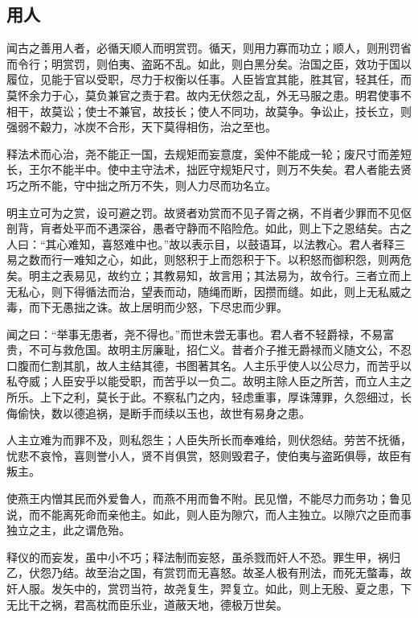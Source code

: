 \documentclass[]{article}
\begin{document}
\hypertarget{header-n1082}{%
\subsection{用人}\label{header-n1082}}

闻古之善用人者，必循天顺人而明赏罚。循天，则用力寡而功立；顺人，则刑罚省而令行；明赏罚，则伯夷、盗跖不乱。如此，则白黑分矣。治国之臣，效功于国以履位，见能于官以受职，尽力于权衡以任事。人臣皆宜其能，胜其官，轻其任，而莫怀余力于心，莫负兼官之责于君。故内无伏怨之乱，外无马服之患。明君使事不相干，故莫讼；使士不兼官，故技长；使人不同功，故莫争。争讼止，技长立，则强弱不觳力，冰炭不合形，天下莫得相伤，治之至也。

释法术而心治，尧不能正一国，去规矩而妄意度，奚仲不能成一轮；废尺寸而差短长，王尔不能半中。使中主守法术，拙匠守规矩尺寸，则万不失矣。君人者能去贤巧之所不能，守中拙之所万不失，则人力尽而功名立。

明主立可为之赏，设可避之罚。故贤者劝赏而不见子胥之祸，不肖者少罪而不见伛剖背，肓者处平而不遇深谷，愚者守静而不陷险危。如此，则上下之恩结矣。古之人曰：``其心难知，喜怒难中也。''故以表示目，以鼓语耳，以法教心。君人者释三易之数而行一难知之心，如此，则怒积于上而怨积于下。以积怒而御积怨，则两危矣。明主之表易见，故约立；其教易知，故言用；其法易为，故令行。三者立而上无私心，则下得循法而治，望表而动，随绳而断，因攒而缝。如此，则上无私威之毒，而下无愚拙之诛。故上居明而少怒，下尽忠而少罪。

闻之曰：``举事无患者，尧不得也。''而世未尝无事也。君人者不轻爵禄，不易富贵，不可与救危国。故明主厉廉耻，招仁义。昔者介子推无爵禄而义随文公，不忍口腹而仁割其肌，故人主结其德，书图著其名。人主乐乎使人以公尽力，而苦乎以私夺威；人臣安乎以能受职，而苦乎以一负二。故明主除人臣之所苦，而立人主之所乐。上下之利，莫长于此。不察私门之内，轻虑重事，厚诛薄罪，久怨细过，长侮偷快，数以德追祸，是断手而续以玉也，故世有易身之患。

人主立难为而罪不及，则私怨生；人臣失所长而奉难给，则伏怨结。劳苦不抚循，忧悲不哀怜，喜则誉小人，贤不肖俱赏，怒则毁君子，使伯夷与盗跖俱辱，故臣有叛主。

使燕王内憎其民而外爱鲁人，而燕不用而鲁不附。民见憎，不能尽力而务功；鲁见说，而不能离死命而亲他主。如此，则人臣为隙穴，而人主独立。以隙穴之臣而事独立之主，此之谓危殆。

释仪的而妄发，虽中小不巧；释法制而妄怒，虽杀戮而奸人不恐。罪生甲，祸归乙，伏怨乃结。故至治之国，有赏罚而无喜怒。故圣人极有刑法，而死无螫毒，故奸人服。发矢中的，赏罚当符，故尧复生，羿复立。如此，则上无殷、夏之患，下无比干之祸，君高枕而臣乐业，道蔽天地，德极万世矣。
\end{document}
